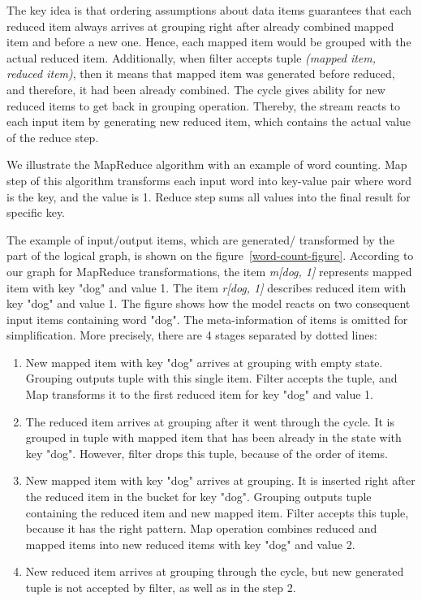 The key idea is that ordering assumptions about data items guarantees that each reduced item always arrives at grouping right after already combined mapped item and before a new one. Hence, each mapped item would be grouped with the actual reduced item. Additionally, when filter accepts tuple {\it (mapped item, reduced item)}, then it means that mapped item was generated before reduced, and therefore, it had been already combined. The cycle gives ability for new reduced items to get back in grouping operation. Thereby, the stream reacts to each input item by generating new reduced item, which contains the actual value of the reduce step.

We illustrate the MapReduce algorithm with an example of word counting. Map step of this algorithm transforms each input word into key-value pair where word is the key, and the value is 1. Reduce step sums all values into the final result for specific key. 

The example of input/output items, which are generated/ transformed by the part of the logical graph, is shown on the figure~\ref {word-count-figure}. According to our graph for MapReduce transformations, the item {\it m[dog, 1]} represents mapped item with key "dog" and value 1. The item {\it r[dog, 1]} describes reduced item with key "dog" and value 1. The figure shows how the model reacts on two consequent input items containing word "dog". The meta-information of items is omitted for simplification. More precisely, there are 4 stages separated by dotted lines:

\begin{enumerate}
    \item New mapped item with key "dog" arrives at grouping with empty state. Grouping outputs tuple with this single item. Filter accepts the tuple, and Map transforms it to the first reduced item for key "dog" and value 1.
    \item The reduced item arrives at grouping after it went through the cycle. It is grouped in tuple with mapped item that has been already in the state with key "dog". However, filter drops this tuple, because of the order of items.
    \item New mapped item with key "dog" arrives at grouping. It is inserted right after the reduced item in the bucket for key "dog". Grouping outputs tuple containing the reduced item and new mapped item. Filter accepts this tuple, because it has the right pattern. Map operation combines reduced and mapped items into new reduced items with key "dog" and value 2.
    \item New reduced item arrives at grouping through the cycle, but new generated tuple is not accepted by filter, as well as in the step 2.
\end{enumerate}

